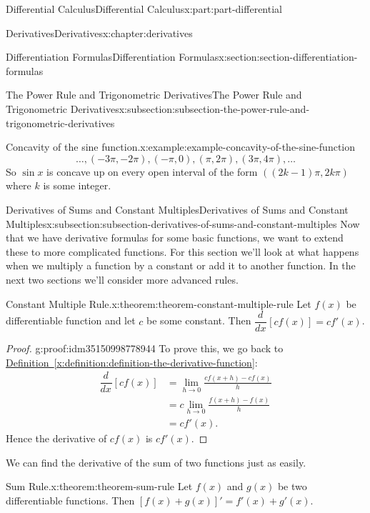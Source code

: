 \documentclass[twoside,10pt,]{tufte-book}
\newcommand{\xreffont}{\relax}
\numberwithin{equation}{part}
\newcommand{\dv}[3][]{\dfrac{d^{#1} #2}{d #3^{#1}}}
\begin{document}
\begin{partptx}{Differential Calculus}{}{Differential Calculus}{}{}{x:part:part-differential}
\begin{chapterptx}{Derivatives}{}{Derivatives}{}{}{x:chapter:derivatives}
\begin{sectionptx}{Differentiation Formulas}{}{Differentiation Formulas}{}{}{x:section:section-differentiation-formulas}
\begin{subsectionptx}{The Power Rule and Trigonometric Derivatives}{}{The Power Rule and Trigonometric Derivatives}{}{}{x:subsection:subsection-the-power-rule-and-trigonometric-derivatives}
\begin{example}{Concavity of the sine function.}{x:example:example-concavity-of-the-sine-function}
\begin{equation*}
\ldots, (-3\pi,-2\pi), (-\pi,0),(\pi,2\pi), (3\pi,4\pi),\ldots
\end{equation*}
So \(\sin x\) is concave up on every open interval of the form \(((2k-1)\pi, 2k\pi)\) where \(k\) is some integer.%
\end{example}
\end{subsectionptx}
%
%
\typeout{************************************************}
\typeout{************************************************}
%
\begin{subsectionptx}{Derivatives of Sums and Constant Multiples}{}{Derivatives of Sums and Constant Multiples}{}{}{x:subsection:subsection-derivatives-of-sums-and-constant-multiples}
Now that we have derivative formulas for some basic functions, we want to extend these to more complicated functions. For this section we'll look at what happens when we multiply a function by a constant or add it to another function. In the next two sections we'll consider more advanced rules.%
\begin{theorem}{Constant Multiple Rule.}{}{x:theorem:theorem-constant-multiple-rule}%
%
Let \(f(x)\) be differentiable function and let \(c\) be some constant. Then \(\dv{}{x}[cf(x)] = cf'(x)\).%
\end{theorem}
\begin{proof}{}{g:proof:idm35150998778944}
To prove this, we go back to \hyperref[x:definition:definition-the-derivative-function]{Definition~{\xreffont\ref{x:definition:definition-the-derivative-function}}}:%
\begin{align*}
\dv{}{x}[cf(x)] & = \lim_{h\to0}\frac{cf(x+h) - cf(x)}{h} \\
& = c\lim_{h\to0}\frac{f(x+h) - f(x)}{h} \\
& = cf'(x). 
\end{align*}
Hence the derivative of \(cf(x)\) is \(cf'(x)\).%
\end{proof}
We can find the derivative of the sum of two functions just as easily.%
\begin{theorem}{Sum Rule.}{}{x:theorem:theorem-sum-rule}%
%
Let \(f(x)\) and \(g(x)\) be two differentiable functions. Then \([f(x)+g(x)]' = f'(x) + g'(x)\).%
\end{theorem}
\end{subsectionptx}
\end{sectionptx}
%
%
\typeout{************************************************}

\end{chapterptx}
\end{partptx}
\end{document}
